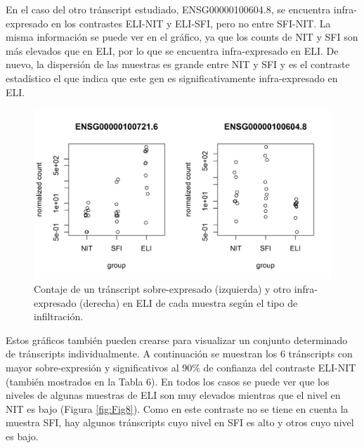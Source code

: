 \documentclass[
]{article}
\begin{document}
En el caso del otro tránscript estudiado, ENSG00000100604.8, se
encuentra infra-expresado en los contrastes ELI-NIT y ELI-SFI, pero no
entre SFI-NIT. La misma información se puede ver en el gráfico, ya que
los counts de NIT y SFI son más elevados que en ELI, por lo que se
encuentra infra-expresado en ELI. De nuevo, la dispersión de las
muestras es grande entre NIT y SFI y es el contraste estadístico el que
indica que este gen es significativamente infra-expresado en ELI.

\begin{figure}

{\centering \includegraphics[width=0.8\linewidth]{results/4.DEAnl/1.CntsTOP} 

}

\caption{Contaje de un tránscript sobre-expresado (izquierda) y otro infra-expresado (derecha) en ELI de cada muestra según el tipo de infiltración.}\label{fig:Fig7}
\end{figure}

Estos gráficos también pueden crearse para visualizar un conjunto
determinado de tránscripts individualmente. A continuación se muestran
los 6 tránscripts con mayor sobre-expresión y significativos al \(90\%\)
de confianza del contraste ELI-NIT (también mostrados en la Tabla 6). En
todos los casos se puede ver que los niveles de algunas muestras de ELI
son muy elevados mientras que el nivel en NIT es bajo (Figura
\ref{fig:Fig8}). Como en este contraste no se tiene en cuenta la muestra
SFI, hay algunos tránscripts cuyo nivel en SFI es alto y otros cuyo
nivel es bajo.
\end{document}
